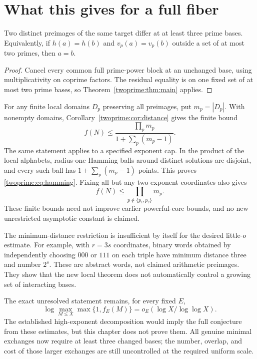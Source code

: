 \section{What this gives for a full fiber}
\begin{corollary}\label{twoprime:cor:distance}
Two distinct preimages of the same target differ at at least three prime bases. Equivalently, if $h(a)=h(b)$ and $v_p(a)=v_p(b)$ outside a set of at most two primes, then $a=b$.
\end{corollary}
\begin{proof}
Cancel every common full prime-power block at an unchanged base, using multiplicativity on coprime factors. The residual equality is on one fixed set of at most two prime bases, so Theorem~\ref{twoprime:thm:main} applies.
\end{proof}

For any finite local domains $D_p$ preserving all preimages, put $m_p=|D_p|$. With nonempty domains, Corollary~\ref{twoprime:cor:distance} gives the finite bound
\begin{equation}\label{twoprime:eq:hamming}
 \boxed{f(N)\le\frac{\prod_p m_p}{1+\sum_p(m_p-1)}.}
\end{equation}
The same statement applies to a specified exponent cap. In the product of the local alphabets, radius-one Hamming balls around distinct solutions are disjoint, and every such ball has $1+\sum_p(m_p-1)$ points. This proves \eqref{twoprime:eq:hamming}. Fixing all but any two exponent coordinates also gives
\[
 f(N)\le\prod_{p\notin\{p_1,p_2\}}m_p.
\]
These finite bounds need not improve earlier powerful-core bounds, and no new unrestricted asymptotic constant is claimed.

The minimum-distance restriction is insufficient by itself for the desired little-$o$ estimate. For example, with $r=3s$ coordinates, binary words obtained by independently choosing $000$ or $111$ on each triple have minimum distance three and number $2^s$. These are abstract words, not claimed arithmetic preimages. They show that the new local theorem does not automatically control a growing set of interacting bases.

The exact unresolved statement remains, for every fixed $E$,
\[
 \log\max_{M\le X}\max\{1,f_E(M)\}
 =o_E(\log X/\log\log X).
\]
The established high-exponent decomposition would imply the full conjecture from these estimates, but this chapter does not prove them. All genuine minimal exchanges now require at least three changed bases; the number, overlap, and cost of those larger exchanges are still uncontrolled at the required uniform scale.

